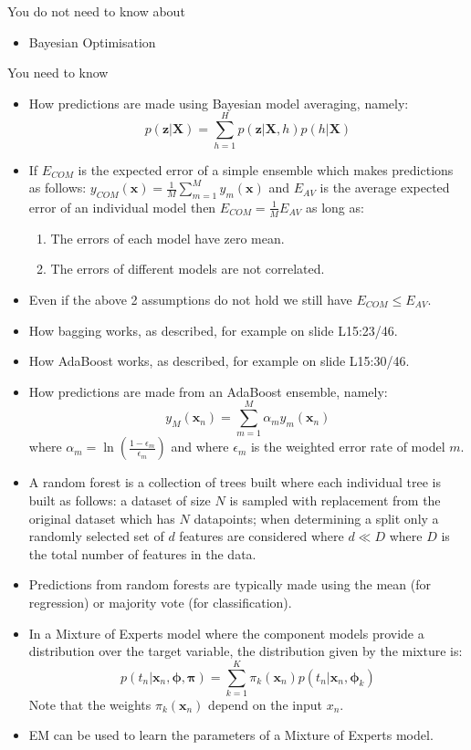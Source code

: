 \documentclass{article}
\newcommand{\bs}{\boldsymbol}
\newcommand{\yntk}{You need to know}
\begin{document}
You do not need to know about
\begin{itemize}
\item  Bayesian Optimisation
\end{itemize}

\yntk{}
\begin{itemize}
\item How predictions are made using Bayesian model averaging, namely:
  \[
    p(\bs z | \bs X) = \sum_{h=1}^H p(\bs z | \bs X, h)p(h|\bs X)
  \]
\item If $E_{COM}$ is the expected error of a simple ensemble which
  makes predictions as follows: $y_{COM}(\bs x) = \frac{1}{M} \sum_{m=1}^M
  y_m(\bs x)$ and $E_{AV}$ is the average expected error of an
  individual model then $E_{COM} = \frac{1}{M} E_{AV}$ as long as:
  \begin{enumerate}
  \item The errors of each model have zero mean.
  \item The errors of different models are not correlated.
  \end{enumerate}
\item Even if the above 2 assumptions do not hold we still have
  $E_{COM} \leq  E_{AV}$.
\item How bagging works, as described, for example on slide L15:23/46.
\item How AdaBoost works, as described, for example on slide
  L15:30/46.
\item How predictions are made from an AdaBoost ensemble, namely:
  \[
    y_M(\bs x_n) = \sum_{m=1}^M \alpha_m y_m(\bs x_n)
  \]
  where $\alpha_{m} = \ln \left(
    \frac{1-\epsilon_{m}}{\epsilon_{m}}\right)$ and where
  $\epsilon_{m}$ is the weighted error rate of model $m$. 
\item A random forest is a collection of trees built where each
  individual tree is built as follows: a dataset of size $N$ is sampled with
  replacement from the original dataset which has $N$ datapoints; when
  determining a split only a randomly selected set of $d$ features are
  considered where $d \ll D$ where $D$ is the total number of features
  in the data.
\item Predictions from random forests are typically made using the
  mean (for regression) or majority vote (for classification).
\item In a Mixture of Experts model where the component models provide
  a distribution over the target variable, the distribution given by
  the mixture is:
  \[
    p(t_n | \bs x_n, \bs \phi, \bs\pi) = \sum_{k=1}^K \pi_k(\bs x_n) p(t_n | \bs x_n, \bs\phi_k)
  \]
  Note that the weights $\pi_k(\bs x_n)$ depend on the
  input $x_n$.
\item EM can be used to learn the parameters of a Mixture of Experts model.
\end{itemize}
\end{document}
